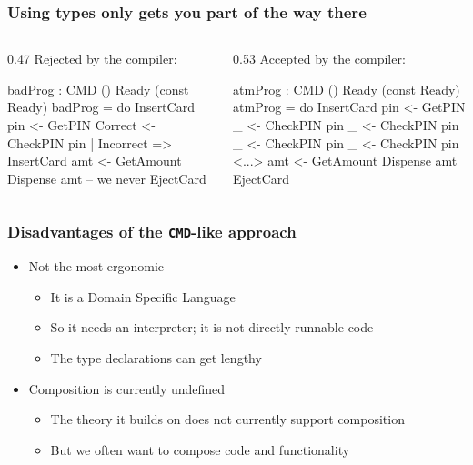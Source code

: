 \documentclass[compress,handout]{beamer}
\begin{document}
\begin{frame}[fragile]  %
  \frametitle{Using types only gets you part of the way there}

  \begin{columns}
  \begin{column}{0.47\framewidth}
    {\color{red} Rejected by the compiler:}
    \vspace*{-3mm}
    \begin{idrislisting}[basicstyle=\ttfamily\scriptsize]
badProg : CMD ()
            Ready (const Ready)
badProg =
  do InsertCard
     pin <- GetPIN
     Correct <- CheckPIN pin
       | Incorrect => InsertCard
     amt <- GetAmount
     Dispense amt 
     -- we never EjectCard
    \end{idrislisting}
  \end{column}

  \pause  %

  \hspace*{-0.7mm}
  \vrule{}

  \begin{column}{0.53\framewidth}
    {\color{orange} Accepted by the compiler:}
    \vspace*{-3mm}
    \begin{idrislisting}[basicstyle=\ttfamily\scriptsize]
atmProg : CMD ()
            Ready (const Ready)
atmProg =
  do InsertCard
     pin <- GetPIN
     _ <- CheckPIN pin
     _ <- CheckPIN pin
     _ <- CheckPIN pin
     _ <- CheckPIN pin
     <...>
     amt <- GetAmount
     Dispense amt 
     EjectCard
    \end{idrislisting}
    \vspace*{-1cm}
  \end{column}
  \end{columns}
\end{frame}


\begin{frame}
  \frametitle{Disadvantages of the \texttt{CMD}-like approach}

  \begin{itemize}
    \item<1-> Not the most ergonomic
    \begin{itemize}
      \item<2-> It is a Domain Specific Language
      \item<3-> So it needs an interpreter; it is not directly runnable code
      \item<4-> The type declarations can get lengthy
    \end{itemize}
    \item<5-> Composition is currently undefined
    \begin{itemize}
      \item<6-> The theory it builds on does not currently support composition
      \item<7-> But we often want to compose code and functionality
    \end{itemize}
  \end{itemize}
\end{frame}
\end{document}
